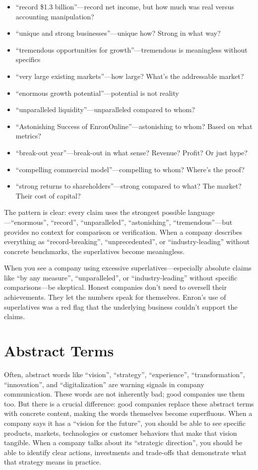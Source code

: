 \begin{itemize}
    \item ``record \$1.3 billion''—record net income, but how much was real versus accounting manipulation?
    \item ``unique and strong businesses''—unique how? Strong in what way?
    \item ``tremendous opportunities for growth''—tremendous is meaningless without specifics
    \item ``very large existing markets''—how large? What's the addressable market?
    \item ``enormous growth potential''—potential is not reality
    \item ``unparalleled liquidity''—unparalleled compared to whom?
    \item ``Astonishing Success of EnronOnline''—astonishing to whom? Based on what metrics?
    \item ``break-out year''—break-out in what sense? Revenue? Profit? Or just hype?
    \item ``compelling commercial model''—compelling to whom? Where's the proof?
    \item ``strong returns to shareholders''—strong compared to what? The market? Their cost of capital?
\end{itemize}

The pattern is clear: every claim uses the strongest possible language—``enormous'', ``record'', ``unparalleled'', ``astonishing'', ``tremendous''—but provides no context for comparison or verification. When a company describes everything as ``record-breaking'', ``unprecedented'', or ``industry-leading'' without concrete benchmarks, the superlatives become meaningless.

When you see a company using excessive superlatives—especially absolute claims like ``by any measure'', ``unparalleled'', or ``industry-leading'' without specific comparisons—be skeptical. Honest companies don't need to oversell their achievements. They let the numbers speak for themselves. Enron's use of superlatives was a red flag that the underlying business couldn't support the claims.

\section{Abstract Terms}

Often, abstract words like ``vision'', ``strategy'', ``experience'', ``transformation'', ``innovation'', and ``digitalization'' are warning signals in company communication. These words are not inherently bad; good companies use them too. But there is a crucial difference: good companies replace these abstract terms with concrete content, making the words themselves become superfluous. When a company says it has a ``vision for the future'', you should be able to see specific products, markets, technologies or customer behaviors that make that vision tangible. When a company talks about its ``strategic direction'', you should be able to identify clear actions, investments and trade-offs that demonstrate what that strategy means in practice.

